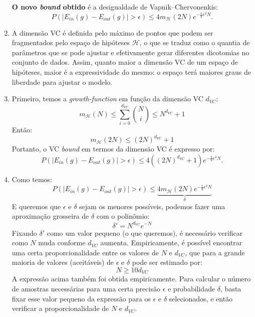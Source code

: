 \documentclass[a4paper,11pt]{article}
\begin{document}
\begin{enumerate}
        \textbf{O novo \textit{bound} obtido} é a desigualdade de Vapnik–Chervonenkis:
        \[
            P(|E_{in}(g) - E_{out}(g)|> \epsilon) \leq 4 m_{\mathcal{H}}(2N) e^{-\frac{1}{8} \epsilon^2N}.
        \]
        
        \item A dimensão VC é definida pelo máximo de pontos que podem ser fragmentados pelo espaço de hipóteses $\mathcal{H}$, o que se traduz como o quantia de parâmetros que se pode ajustar e efetivamente gerar diferentes dicotomias no conjunto de dados. Assim, quanto maior a dimensão VC de um espaço de hipóteses, maior é a expressividade do mesmo: o espaço terá maiores graus de liberdade para ajustar o modelo.
        
        \item Primeiro, temos a \textit{growth-function} em função da dimensão VC $d_{VC}$:
        \[
            m_{\mathcal{H}}(N) \leq \sum^{d_{VC}}_{i=0} {N \choose i} \leq N^{d_{VC}} + 1
        \]
        Então:
        \[
            m_{\mathcal{H}}(2N) \leq (2N)^{d_{VC}} + 1
        \]
        Portanto, o VC \textit{bound} em termos da dimensão VC é expresso por:
        \[
            P(|E_{in}(g) - E_{out}(g)|> \epsilon) \leq 4 ((2N)^{d_{VC}} + 1) e^{-\frac{1}{8} \epsilon^2N}.
        \]
        
        \item Como temos:
        \[
            P(|E_{in}(g) - E_{out}(g)|> \epsilon) \leq \underbrace{4 m_{\mathcal{H}}(2N) e^{-\frac{1}{8} \epsilon^2N}}_{\delta}
        \]
        E queremos que $\epsilon$ e $\delta$ sejam os menores possíveis, podemos fazer uma aproximação grosseira de $\delta$ com o polinômio:
        \[
            \delta' = N^{d_{VC}} e^{-N}
        \]
        Fixando $\delta'$ como um valor pequeno (o que queremos), é necessário verificar como $N$ muda conforme $d_{VC}$ aumenta. Empiricamente, é possível encontrar uma certa proporcionalidade entre os valores de $N$ e $d_{VC}$, que para a grande maioria de valores (aceitáveis) de $\epsilon$ e $\delta$ pode ser estimado por:
        \[
            N \geq 10 d_{VC}
        \]
        A expressão acima também foi obtida empiricamente. Para calcular o número de amostras necessárias para uma certa precisão $\epsilon$ e probabilidade $\delta$, basta fixar esse valor pequeno da expressão para os $\epsilon$ e $\delta$ selecionados, e então verificar a proporcionalidade de $N$ e $d_{VC}$.
        

\end{enumerate}
\end{document}
